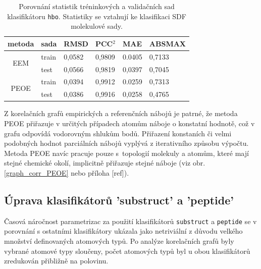 \begin{table}[h]
    \renewcommand{\arraystretch}{1.4}
    \centering
    \begin{tabular}{c|l|l|l|l|l}
         \textbf{metoda} & \textbf{sada} & \textbf{RMSD} & \textbf{PCC$^2$} & \textbf{MAE} & \textbf{ABSMAX}\\
         \hline
         \multirow{2}{4em}{EEM} & train & 0,0582 & 0,9809 & 0.0405 & 0,7133  \\
         & test & 0,0566 & 0,9819 & 0,0397 & 0,7045 \\
         \hline
         \multirow{2}{4em}{PEOE} & train & 0,0394 & 0,9912 & 0.0259 & 0,7313  \\
         & test & 0,0386  & 0,9916 & 0,0258 & 0,4765 \\
    \end{tabular}
    \caption{Porovnání statistik tréninkových a validačních sad klasifikátoru \texttt{hbo}. Statistiky se vztahují ke klasifikaci SDF molekulové sady.}
    \label{prenositelnost}
\end{table}
\vspace{2cm}


Z korelačních grafů empirických a referenčních nábojů je patrné, že metoda PEOE přiřazuje v určitých případech atomům náboje o konstatní hodnotě, což v grafu odpovídá vodorovným shlukům bodů. Přiřazení konstaních či velmi podobných hodnot parciálních nábojů vyplývá z iterativního způsobu výpočtu. Metoda PEOE navíc pracuje pouze s~topologií molekuly a atomům, které mají stejné chemické okolí, implicitně přiřazuje stejné náboje (viz obr. \ref{graph_corr_PEOE} nebo příloha [ref]).

\subsection{Úprava klasifikátorů 'substruct' a 'peptide'}
Časová náročnost parametrizac za použití klasifikátorů \verb|substruct| a \verb|peptide| se v porovnání s ostatními klasifikátory ukázala jako netriviální z důvodu velkého množství definovaných atomových typů. Po analýze korelačních grafů byly vybrané atomové typy sloučeny, počet atomových typů byl u obou klasifikátorů zredukován přibližně na polovinu.

